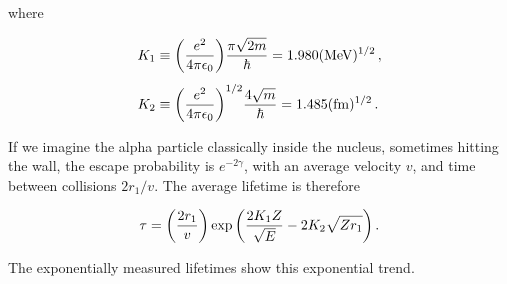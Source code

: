 \documentclass[12pt, titlepage]{article}
\begin{document}
\begin{mdframed}[backgroundcolor=gray!20]
where

\begin{subequations}
\begin{align}
	K_1 &\equiv \qty(\frac{e^2}{4\pi\epsilon_0})\frac{\pi\sqrt{2m}}{\hbar} = 1.980(\si{\mega\electronvolt})^{1/2}\,, \\[4pt]
	K_2 &\equiv \qty(\frac{e^2}{4\pi\epsilon_0})^{1/2}\frac{4\sqrt{m}}{\hbar} = 1.485(\si{\femto\metre})^{1/2} \,.
\end{align}
\end{subequations}

If we imagine the alpha particle classically inside the nucleus, sometimes hitting the wall, the escape probability is $e^{-2\gamma}$, with an average velocity $v$, and time between collisions $2r_1/v$. The average lifetime is therefore

\begin{equation}
	\tau = \qty(\frac{2r_1}{v})\exp\qty(\frac{2K_1Z}{\sqrt{E}} - 2K_2\sqrt{Zr_1}) \,.
\end{equation} 

The exponentially measured lifetimes show this exponential trend.
\end{mdframed}
\end{document}
